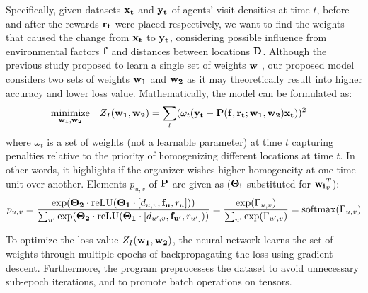 Specifically, given datasets $\mathbf{x_t}$ and $\mathbf{y_t}$ of agents' visit densities at time $t$, before and after the rewards $\mathbf{r_t}$ were placed respectively, we want to find the weights that caused the change from $\mathbf{x_t}$ to $\mathbf{y_t}$, considering possible influence from environmental factors $\mathbf{f}$ and distances between locations $\mathbf{D}$. Although the previous study proposed to learn a single set of weights $\mathbf{w}$ \cite{Xue2016Avi2}, our proposed model considers two sets of weights $\mathbf{w_1}$ and $\mathbf{w_2}$ as it may theoretically result into higher accuracy and lower loss value. Mathematically, the model can be formulated as:
\begin{equation} \label{eqn:iden_problem}
    \begin{aligned}
        & \underset{\mathbf{w_1}, \mathbf{w_2}}{\text{minimize}}
        & & Z_I(\mathbf{w_1}, \mathbf{w_2}) = \sum_{t} (\omega_t(\mathbf{y_t} - \mathbf{P}(\mathbf{f}, \mathbf{r_t}; \mathbf{w_1}, \mathbf{w_2})\mathbf{x_t}))^{2}
    \end{aligned}
\end{equation}
where $\omega_t$ is a set of weights (not a learnable parameter) at time $t$ capturing penalties relative to the priority of homogenizing different locations at time $t$. In other words, it highlights if the organizer wishes higher homogeneity at one time unit over another. Elements $p_{u, v}$ of $\mathbf{P}$ are given as ($\mathbf{\Theta_i}$ substituted for $\mathbf{w_i}_v^T$):
\begin{equation} \label{eqn:puv_equation}
p_{u, v} = \frac{\exp(\mathbf{\Theta_2} \cdot \text{reLU} (\mathbf{\Theta_1} \cdot [d_{u, v}, \mathbf{f_{u}}, r_{u}]))}{\sum_{u'} \exp(\mathbf{\Theta_2} \cdot \text{reLU} (\mathbf{\Theta_1} \cdot [d_{u', v}, \mathbf{f_{u'}}, r_{u'}]))} = \frac{\exp(\Gamma_{u, v})}{\sum_{u'}\exp(\Gamma_{u', v})} = \text{softmax}(\Gamma_{u, v})
\end{equation}

To optimize the loss value $Z_I(\mathbf{w_1}, \mathbf{w_2})$, the neural network learns the set of weights through multiple epochs of backpropagating the loss using gradient descent. Furthermore, the program preprocesses the dataset to avoid unnecessary sub-epoch iterations, and to promote batch operations on tensors.

